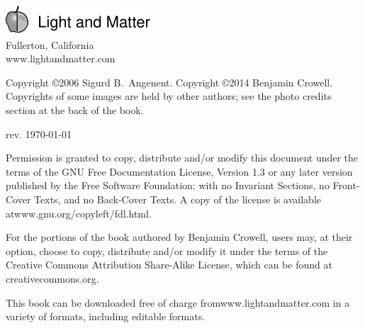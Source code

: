 \thispagestyle{empty}

\vspace{100mm}

\noindent
\includegraphics{cover/lmlogo}\\
Fullerton, California\\
www.lightandmatter.com

\vspace{20mm}
\noindent
Copyright \copyright 2006 Sigurd B.~Angenent.
Copyright \copyright  2014 Benjamin Crowell.
Copyrights of some images are held by other authors; see the photo credits section
at the back of the book.

\vspace{20mm}
\noindent
rev. \today{}

\vspace{6mm}
\noindent
Permission is granted to copy, distribute and/or
modify this document under the terms of the GNU Free Documentation License, Version
1.3 or any later version published by the Free Software Foundation; with no Invariant
Sections, no Front-Cover Texts, and no Back-Cover Texts. A copy of the license is
available at\linebreak[4]
www.gnu.org/copyleft/fdl.html.

For the portions of the book authored by Benjamin Crowell, users may, at their option,
choose to copy, distribute and/or modify it
under the terms of the Creative Commons Attribution
Share-Alike License, which can be found at creativecommons.org.

This book can be downloaded free of charge
from\linebreak[4]
www.lightandmatter.com in a variety of formats,
including editable formats.
